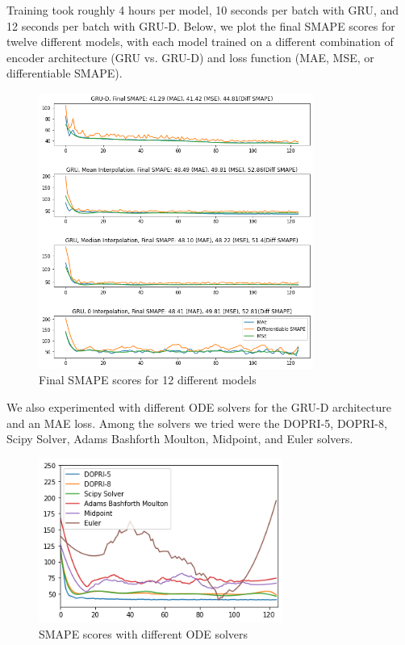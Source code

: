 \documentclass{article} %
\begin{document}
Training took roughly 4 hours per model, 10 seconds per batch with GRU, and 12 seconds per batch with GRU-D. Below, we plot the final SMAPE scores for twelve different models, with each model trained on a different combination of encoder architecture (GRU vs. GRU-D) and loss function (MAE, MSE, or differentiable SMAPE).
\begin{figure}[h]
  \centering
  \includegraphics[width=9cm]{losses.png}
  \caption{Final SMAPE scores for 12 different models}
\end{figure}

We also experimented with different ODE solvers for the GRU-D architecture and an MAE loss. Among the solvers we tried were the DOPRI-5, DOPRI-8, Scipy Solver, Adams Bashforth Moulton, Midpoint, and Euler solvers. 
\begin{figure}[h]
  \centering
  \includegraphics[width=8cm]{solvers.png}
  \caption{SMAPE scores with different ODE solvers}
\end{figure}
\end{document}
